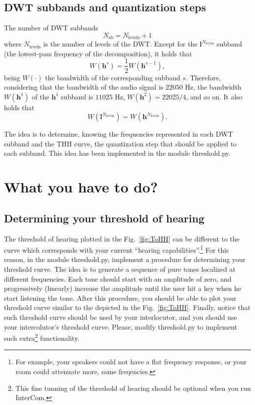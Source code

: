 \subsection{DWT subbands and quantization steps}
The number of DWT subbands
\begin{equation}
  N_{\text{sb}} = N_{\text{levels}} + 1
\end{equation}
where $N_{\text{levels}}$ is the number of levels of the DWT. Except
for the ${\mathbf l}^{N_{\text{levels}}}$ subband (the lowest-pass
frequency of the decomposition), it holds that
\begin{equation}
  W({\mathbf h}^s) = \frac{1}{2}W({\mathbf h}^{s-1}),
\end{equation}
being $W(\cdot)$ the bandwidth of the corresponding
subband $s$. Therefore, considering that the bandwidth of the audio signal
is $22050$ Hz, the bandwidth $W({\mathbf h}^1)$ of the ${\mathbf h}^1$ subband is $11025$ Hz,
$W({\mathbf h} ^2)=22025/4$, and so on. It also holds that
\begin{equation}
  W({\mathbf l}^{N_{\text{levels}}}) = W({\mathbf h}^{N_{\text{levels}}}).
\end{equation}

The idea is to determine, knowing the frequencies represented in each
DWT subband and the THH curve, the quantization step that should be
applied to each subband. This idea has been implemented in the module
threshold.py.

\section{What you have to do?}

\subsection{Determining your threshold of hearing}

The threshold of hearing plotted in the Fig.~\ref{fig:ToHH} can be
different to the curve which corresponds with your current ``hearing
capabilities''.\footnote{For example, your speakers could not have a
  flat frequency response, or your room could attenuate more, some
  freqencies.} For this reason, in the module threshold.py, implement
a procedure for determining your threshold curve. The idea is to
generate a sequence of pure tones localized at different
frequencies. Each tone should start with an amplitude of zero, and
progressively (linearly) increase the amplitude until the user hit a
key when he start listening the tone. After this procedure, you should
be able to plot your threshold curve similar to the depicted in the
Fig.~\ref{fig:ToHH}. Finally, notice that such threshold curve should
be used by your interlocutor, and you should use your intercolutor's
threshold curve. Please, modify threshold.py to implement such
extra\footnote{This fine tunning of the threshold of hearing should be
  optional when you run InterCom.} functionality.

